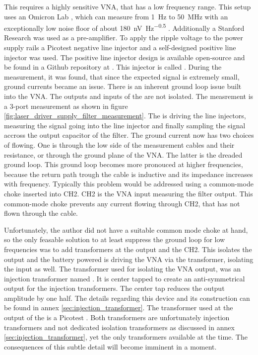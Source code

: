 This requires a highly sensitive VNA, that has a low frequency range. This setup uses an Omicron Lab , which can measure from \qty{1}{\Hz} to \qty{50}{\MHz} with an exceptionally low noise floor of about \qty{180}{\nV \Hz\tothe{-0.5}} \cite{datasheet_bode100}. Additionally a Stanford Research  was used as a pre-amplifier. To apply the ripple voltage to the power supply rails a Picotest  negative line injector and a self-designed positive line injector was used. The positive line injector design is available open-source and be found in a Github repository at \cite{line_injector_github}. This injector is called . During the measurement, it was found, that since the expected signal is extremely small, ground currents became an issue. There is an inherent ground loop issue built into the VNA. The outputs and inputs of the  are not isolated. The measrement is a 3-port measurement as shown in figure \ref{fig:laser_driver_supply_filter_measurement}. The  is driving the line injectors, measuring the signal going into the line injector and finally sampling the signal accross the output capacitor of the filter. The ground current now has two choices of flowing. One is through the low side of the measurement cables and their resistance, or through the ground plane of the VNA. The latter is the dreaded ground loop. This ground loop becomes more pronouced at higher frequencies, because the return path trough the cable is inductive and its impedance increases with frequency. Typically this problem would be addressed using a common-mode choke inserted into CH2. CH2 is the VNA input measuring the filter output. This common-mode choke prevents any current flowing through CH2, that has not flown through the cable.

Unfortunately, the author did not have a suitable common mode choke at hand, so the only feasable solution to at least suppress the ground loop for low frequencies was to add transformers at the output and the CH2. This isolates the output and the battery powered  is driving the VNA via the transformer, isolating the input as well. The transformer used for isolating the VNA output, was an injection transformer named . It is center tapped to create an anti-symmetrical output for the injection transformers. The center tap reduces the output amplitude by one half. The details regarding this device and its construction can be found in annex \ref{sec:injection_transformer}. The transformer used at the output of the  is a Picotest . Both transformers are unfortunately injection transformers and not dedicated isolation transformers as discussed in annex \ref{sec:injection_transformer}, yet the only transformers available at the time. The consequences of this subtle detail will become imminent in a moment.

